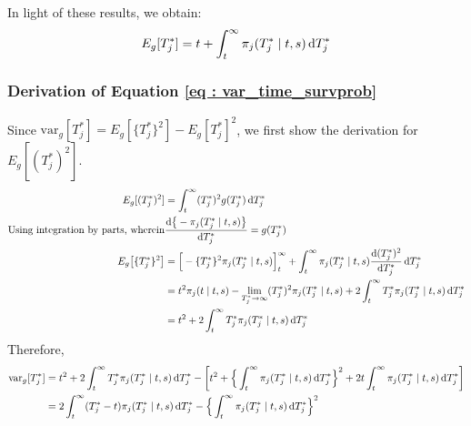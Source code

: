 In light of these results, we obtain:
\begin{equation*}
E_g[T^*_j] = t + \int_t^{\infty} \pi_j(T^*_j \mid t, s) \mathop{}\!\mathrm{d} T^*_j\\
\end{equation*}

\subsubsection{Derivation of Equation \ref{eq : var_time_survprob}}
Since $\mbox{var}_g[T^*_j] = E_g[\{T^*_j\}^2] - E_g[T^*_j]^2$, we first show the derivation for $E_g[(T^*_j)^2]$.
\begin{equation*}
\begin{split}
E_g[(T^*_j)^2] &= \int_t^{\infty} (T^*_j)^2 g(T^*_j)\diff T^*_j\\
\text{Using integration by parts, wherein} & \frac{\diff \big\{-\pi_j(T^*_j \mid t, s)\big\}}{\diff T^*_j} = g(T^*_j)\\
E_g\big[\{T^*_j\}^2\big] &= \Big[-\{T^*_j\}^2\pi_j(T^*_j \mid t, s)\Big]_t^\infty + \int_t^{\infty} \pi_j(T^*_j \mid t, s) \frac{\diff (T^*_j)^2}{\diff T^*_j} \diff T^*_j\\
&= t^2 \pi_j(t \mid t, s) - \lim_{T^*_j\to \infty}(T^*_j)^2 \pi_j(T^*_j \mid t, s) + 2 \int_t^{\infty} T^*_j \pi_j(T^*_j \mid t, s) \diff T^*_j\\
&= t^2 + 2 \int_t^{\infty} T^*_j \pi_j(T^*_j \mid t, s) \diff T^*_j
\end{split}
\end{equation*}
Therefore,
\begin{equation*}
\begin{split}
\mbox{var}_g[T^*_j] &= t^2 + 2 \int_t^{\infty} T^*_j \pi_j(T^*_j \mid t, s) \mathop{}\!\mathrm{d} T^*_j - \bigg[t^2 +  \Big\{\int_t^\infty \pi_j(T^*_j \mid t, s) \mathop{}\!\mathrm{d} T^*_j \Big\}^2 + 2t\int_t^\infty \pi_j(T^*_j \mid t, s) \mathop{}\!\mathrm{d} T^*_j \bigg]\\
&=2 \int_t^{\infty} (T^*_j - t) \pi_j(T^*_j \mid t, s) \mathop{}\!\mathrm{d} T^*_j -  \Big\{\int_t^\infty \pi_j(T^*_j \mid t, s) \mathop{}\!\mathrm{d} T^*_j \Big\}^2
\end{split}
\end{equation*}
